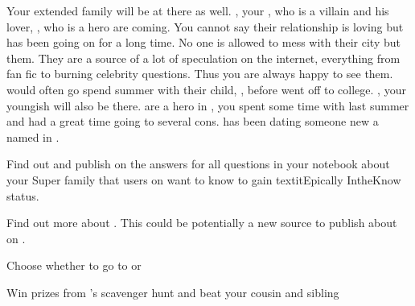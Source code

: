 \documentclass[char]{LRSguildcamp1}
\begin{document}
Your extended family will be at there as well. \cOldest{}, your \cOldest{\uncle}, who is a villain and his lover, \cOS{}, who is a hero are coming. You cannot say their relationship is loving but has been going on for a long time. No one is allowed to mess with their city but them. They are a source of a lot of speculation on the internet, everything from fan fic to burning celebrity questions. Thus you are always happy to see them. \cTeen{} would often go spend summer with their child, \cGrad{}, before \cGrad{\they} went off to college.  \cYoungest{}, your youngish \cYoungest{\uncle} will also be there.  are a hero in \pCityYoungest{}, you spent some time with \cYoungest{\them} last summer and had a great time going to several cons.  \cYoungest{} has been dating someone new a \cAS{\hero} named \cAS{} in \pCityYoungest{}. 



\begin{itemz}[Goals]
	\item Find out and publish on \pTweenwebsite{} the answers for all questions in your notebook about your Super family that users on \pTweenwebsite{} want to know to gain textit{Epically IntheKnow} status. 
	
	\item Find out more about \cAS{}. This could be potentially a new source to publish about on \pTweenwebsite{}.
	
	\item Choose whether to go to \pSuperSchool{} or \pNormalSchool{}
	
	\item Win prizes from \cGrandma{}'s scavenger hunt and beat your cousin and sibling
\end{itemz}
\end{document}
